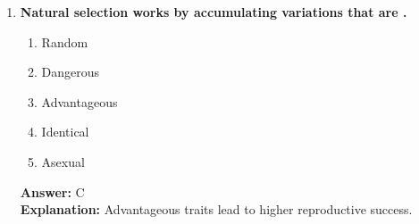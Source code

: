 \documentclass[11pt, a4paper]{article}
\begin{document}
\begin{enumerate}[leftmargin=*, label=\arabic*.]
\item \textbf{Natural selection works by accumulating variations that are \underline{\hspace{1cm}}.}
\begin{enumerate}[label=\Alph*.]
\item Random
\item Dangerous
\item Advantageous
\item Identical
\item Asexual
\end{enumerate}
\textbf{Answer:} C \\
\textbf{Explanation:} Advantageous traits lead to higher reproductive success.

\end{enumerate}
\end{document}
